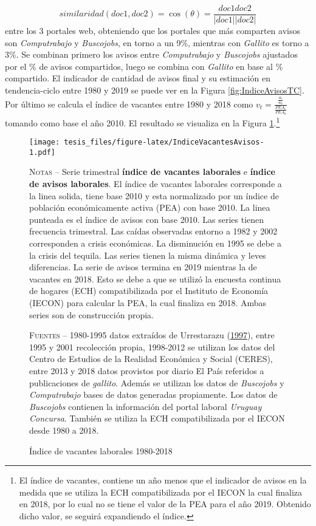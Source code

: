 \documentclass[12pt,oneside]{reedthesis}
\makeatletter
\def\maxwidth{ %
  \ifdim\Gin@nat@width>\linewidth
    \linewidth
  \else
    \Gin@nat@width
  \fi
}
\makeatother
\begin{document}
\[
similaridad(doc1, doc2) = \cos(\theta) = \frac{doc1doc2}{|doc1||doc2|}
\]
entre los 3 portales web, obteniendo que los portales que más comparten avisos son \emph{Computrabajo} y \emph{Buscojobs}, en torno a un 9\%, mientras con \emph{Gallito} es torno a 3\%. Se combinan primero los avisos entre \emph{Computrabajo} y \emph{Buscojobs} ajustados por el \% de avisos compartidos, luego se combina con \emph{Gallito} en base al \% compartido. El indicador de cantidad de avisos final y su estimación en tendencia-ciclo entre 1980 y 2019 se puede ver en la Figura \ref{fig:IndiceAvisosTC}. Por último se calcula el índice de vacantes entre 1980 y 2018 como \(v_t=\frac{\frac{a_t}{a_0}}{\frac{PEA_t}{PEA_0}}\) tomando como base el año 2010. El resultado se visualiza en la Figura \ref{fig:IndiceVacantesAvisos}.\footnote{El índice de vacantes, contiene un año menos que el indicador de avisos en la medida que se utiliza la ECH compatibilizada por el IECON la cual finaliza en 2018, por lo cual no se tiene el valor de la PEA para el año 2019. Obtenido dicho valor, se seguirá expandiendo el índice.}
\begin{figure}
\texttt{[image: tesis\_files/figure-latex/IndiceVacantesAvisos-1.pdf]}
\caption{Índice de vacantes laborales 1980-2018}\label{fig:IndiceVacantesAvisos}\textsc{}

\footnotesize\textsc{Notas} -- Serie trimestral \textbf{índice de vacantes laborales} e \textbf{índice de avisos laborales}. El índice de vacantes laborales corresponde a la linea solida, tiene base 2010 y esta normalizado por un índice de  población económicamente activa (PEA) con base 2010. La linea punteada es el índice de avisos con base 2010. Las series tienen frecuencia trimestral. Las caídas observadas entorno a 1982 y 2002 corresponden a crisis económicas. La disminución en 1995 se debe a la crisis del tequila. Las series tienen la misma dinámica y leves diferencias. La serie de avisos termina en 2019 mientras la de vacantes en 2018. Esto se debe a que se utilizó la encuesta continua de hogares (ECH) compatibilizada por el Instituto de Economía (IECON) para calcular la PEA, la cual finaliza en 2018. Ambas series son de construcción propia.

\textsc{Fuentes} -- 1980-1995 datos extraídos de Urrestarazu (\protect\hyperlink{ref-Urrestarazu1997}{1997}), entre 1995 y 2001 recolección propia, 1998-2012 se utilizan los datos del Centro de Estudios de la Realidad Económica y Social (CERES), entre 2013 y 2018 datos provistos por diario El País referidos a publicaciones de \textit{gallito}. Además se utilizan los datos de \textit{Buscojobs} y \textit{Computrabajo} bases de datos generadas propiamente. Los datos de \textit{Buscojobs} contienen la información del portal laboral \textit{Uruguay Concursa}. También se utiliza la ECH compatibilizada por el IECON desde 1980 a 2018.
\end{figure}
\end{document}
